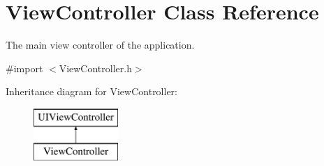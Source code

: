 \hypertarget{interface_view_controller}{\section{View\-Controller Class Reference}
\label{interface_view_controller}
}


The main view controller of the application.  




{\ttfamily \#import $<$View\-Controller.\-h$>$}

Inheritance diagram for View\-Controller\-:\begin{figure}[H]
\begin{center}
\leavevmode
\includegraphics[height=2.000000cm]{interface_view_controller}
\end{center}
\end{figure}
